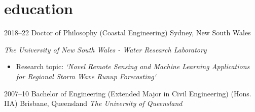 
\section{education}
\begin{entrylist}
\entry%
{2018--22}
{Doctor of Philosophy {\normalfont (Coastal Engineering)}}%
{Sydney, New South Wales}
{\emph{The University of New South Wales - Water Research Laboratory}
  \begin{itemize}
  \item Research topic: \textit{`Novel Remote Sensing and Machine Learning Applications for Regional Storm Wave Runup Forecasting`}
  \end{itemize}
}

\entry%
{2007--10}
{Bachelor of Engineering {\normalfont (Extended Major in Civil Engineering) (Hons. IIA)}}%
{Brisbane, Queensland}
{\emph{The University of Queensland}
}
\end{entrylist}
